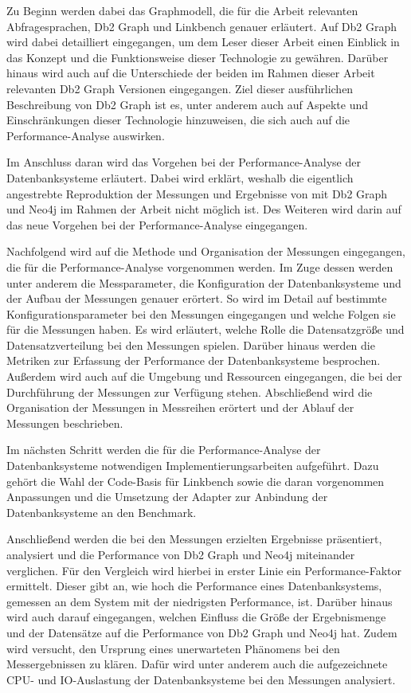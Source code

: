 Zu Beginn werden dabei das Graphmodell, die für die Arbeit relevanten Abfragesprachen, Db2 Graph und Linkbench genauer erläutert. Auf Db2 Graph wird dabei detailliert eingegangen, um dem Leser dieser Arbeit einen Einblick in das Konzept und die Funktionsweise dieser Technologie zu gewähren. Darüber hinaus wird auch auf die Unterschiede der beiden im Rahmen dieser Arbeit relevanten Db2 Graph Versionen eingegangen. Ziel dieser ausführlichen Beschreibung von Db2 Graph ist es, unter anderem auch auf Aspekte und Einschränkungen dieser Technologie hinzuweisen, die sich auch auf die Performance-Analyse auswirken.

Im Anschluss daran wird das Vorgehen bei der Performance-Analyse der Datenbanksysteme erläutert. Dabei wird erklärt, weshalb die eigentlich angestrebte Reproduktion der Messungen und Ergebnisse von  mit Db2 Graph und Neo4j im Rahmen der Arbeit nicht möglich ist. Des Weiteren wird darin auf das neue Vorgehen bei der Performance-Analyse eingegangen. 

Nachfolgend wird auf die Methode und Organisation der Messungen eingegangen, die für die Performance-Analyse vorgenommen werden. Im Zuge dessen werden unter anderem die Messparameter, die Konfiguration der Datenbanksysteme und der Aufbau der Messungen genauer erörtert. So wird im Detail auf bestimmte Konfigurationsparameter bei den Messungen eingegangen und welche Folgen sie für die Messungen haben. Es wird erläutert, welche Rolle die Datensatzgröße und Datensatzverteilung bei den Messungen spielen. Darüber hinaus werden die Metriken zur Erfassung der Performance der Datenbanksysteme besprochen. Außerdem wird auch auf die Umgebung und Ressourcen eingegangen, die bei der Durchführung der Messungen zur Verfügung stehen. Abschließend wird die Organisation der Messungen in Messreihen erörtert und der Ablauf der Messungen beschrieben.  

Im nächsten Schritt werden die für die Performance-Analyse der Datenbanksysteme notwendigen Implementierungsarbeiten aufgeführt. Dazu gehört die Wahl der Code-Basis für Linkbench sowie die daran vorgenommen Anpassungen und die Umsetzung der Adapter zur Anbindung der Datenbanksysteme an den Benchmark. 

Anschließend werden die bei den Messungen erzielten Ergebnisse präsentiert, analysiert und die Performance von Db2 Graph und Neo4j miteinander verglichen. Für den Vergleich wird hierbei in erster Linie ein Performance-Faktor ermittelt. Dieser gibt an, wie hoch die Performance eines Datenbanksystems, gemessen an dem System mit der niedrigsten Performance, ist. Darüber hinaus wird auch darauf eingegangen, welchen Einfluss die Größe der Ergebnismenge und der Datensätze auf die Performance von Db2 Graph und Neo4j hat. Zudem wird versucht, den Ursprung eines unerwarteten Phänomens bei den Messergebnissen zu klären. Dafür wird unter anderem auch die aufgezeichnete CPU- und IO-Auslastung der Datenbanksysteme bei den Messungen analysiert.